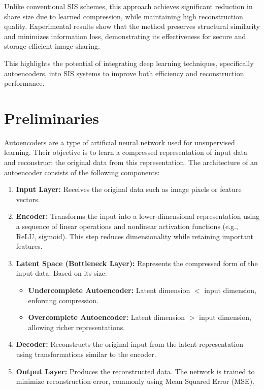 Unlike conventional SIS schemes, this approach achieves significant reduction in share size due to learned compression, while maintaining high reconstruction quality. Experimental results show that the method preserves structural similarity and minimizes information loss, demonstrating its effectiveness for secure and storage-efficient image sharing.

This highlights the potential of integrating deep learning techniques, specifically autoencoders, into SIS systems to improve both efficiency and reconstruction performance.


\section{Preliminaries}
\label{sec:lad-prelim}


Autoencoders are a type of artificial neural network used for unsupervised learning. Their objective is to learn a compressed representation of input data and reconstruct the original data from this representation. The architecture of an autoencoder consists of the following components:

\begin{enumerate}
    \item \textbf{Input Layer:} Receives the original data such as image pixels or feature vectors.

    \item \textbf{Encoder:} Transforms the input into a lower-dimensional representation using a sequence of linear operations and nonlinear activation functions (e.g., ReLU, sigmoid). This step reduces dimensionality while retaining important features.

    \item \textbf{Latent Space (Bottleneck Layer):} Represents the compressed form of the input data. Based on its size:
    \begin{itemize}
        \item \textbf{Undercomplete Autoencoder:} Latent dimension $<$ input dimension, enforcing compression.
        \item \textbf{Overcomplete Autoencoder:} Latent dimension $>$ input dimension, allowing richer representations.
    \end{itemize}

    \item \textbf{Decoder:} Reconstructs the original input from the latent representation using transformations similar to the encoder.

    \item \textbf{Output Layer:} Produces the reconstructed data. The network is trained to minimize reconstruction error, commonly using Mean Squared Error (MSE).
\end{enumerate}

